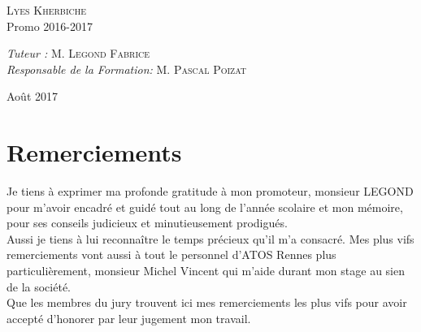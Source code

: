 \documentclass[12pt, a4paper, openany]{report}
\begin{document}
\begin{titlepage}
\begin{sffamily}
\begin{center}
    \begin{minipage}{0.4\textwidth}
      \begin{flushleft} \large
         \textsc{Lyes Kherbiche}\\
        Promo 2016-2017\\
      \end{flushleft}
    \end{minipage}
    \begin{minipage}{0.4\textwidth}
      \begin{flushright} \large
        \emph{Tuteur :}  \textsc{M. Legond Fabrice}\\
        \emph{Responsable de la Formation:} \textsc{M. Pascal Poizat}
      \end{flushright}
    \end{minipage}

    \vfill

    {\large Août 2017}

  \end{center}
  \end{sffamily}      
      
      
      
        
  \end{titlepage}
\makeatother



\chapter*{Remerciements}

  Je tiens à exprimer ma profonde gratitude à mon promoteur, monsieur LEGOND pour m'avoir encadré et guidé tout au long de l'année scolaire et mon mémoire, pour ses conseils judicieux et minutieusement prodigués.\\
  
  Aussi je tiens à lui reconnaître le temps précieux qu’il m'a consacré. Mes plus vifs remerciements vont aussi à tout le personnel d'ATOS Rennes plus particulièrement, monsieur Michel Vincent qui m’aide durant mon stage au sien de la société. \\
  
   Que les membres du jury trouvent ici mes remerciements les plus vifs pour avoir accepté d’honorer par leur jugement mon travail.\\
   
\end{document}
